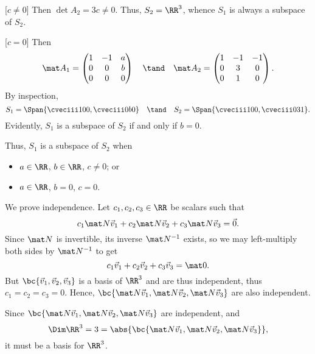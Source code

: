 \begin{solution}
    \begin{ppart}
        [$c \neq 0$] Then $\det A_2 = 3c \neq 0$. Thus, $S_2 = \RR^3$, whence $S_1$ is always a subspace of $S_2$.

        [$c = 0$] Then \[\mat A_1 = \begin{pmatrix}1 & -1 & a \\ 0 & 0 & b \\ 0 & 0 & 0\end{pmatrix} \quad \tand \quad \mat A_2 = \begin{pmatrix}1 & -1 & -1 \\ 0 & 3 & 0 \\ 0 & 1 & 0\end{pmatrix}.\] By inspection, \[S_1 = \Span{\cveciii100, \cveciii0b0} \quad \tand \quad S_2 = \Span{\cveciii100, \cveciii031}.\] Evidently, $S_1$ is a subspace of $S_2$ if and only if $b = 0$.

        Thus, $S_1$ is a subspace of $S_2$ when
        \begin{itemize}
            \item $a \in \RR$, $b \in \RR$, $c \neq 0$; or
            \item $a \in \RR$, $b = 0$, $c = 0$.
        \end{itemize}
    \end{ppart}
    \begin{ppart}
        We prove independence. Let $c_1, c_2, c_3 \in \RR$ be scalars such that \[c_1 \mat N \vec v_1 + c_2 \mat N \vec v_2 + c_3 \mat N \vec v_3 = \vec 0.\] Since $\mat N$ is invertible, its inverse $\mat N^{-1}$ exists, so we may left-multiply both sides by $\mat N^{-1}$ to get \[c_1 \vec v_1 + c_2 \vec v_2 + c_3 \vec v_3 = \mat 0.\] But $\bc{\vec v_1, \vec v_2, \vec v_3}$ is a basis of $\RR^3$ and are thus independent, thus $c_1 = c_2 = c_3 = 0$. Hence, $\bc{\mat N \vec v_1, \mat N \vec v_2, \mat N \vec v_3}$ are also independent.

        Since $\bc{\mat N \vec v_1, \mat N \vec v_2, \mat N \vec v_3}$ are independent, and \[\Dim \RR^3 = 3 = \abs{\bc{\mat N \vec v_1, \mat N \vec v_2, \mat N \vec v_3}},\] it must be a basis for $\RR^3$.
    \end{ppart}
\end{solution}

